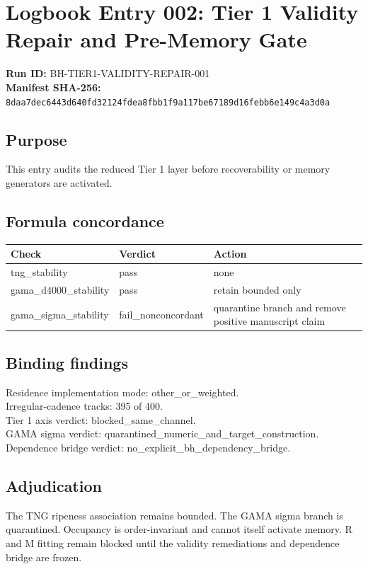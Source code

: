 \documentclass[11pt]{article}
\begin{document}
\section*{Logbook Entry 002: Tier 1 Validity Repair and Pre-Memory Gate}
\textbf{Run ID:} BH-TIER1-VALIDITY-REPAIR-001\\
\textbf{Manifest SHA-256:} \texttt{8daa7dec6443d640fd32124fdea8fbb1f9a117be67189d16febb6e149c4a3d0a}
\subsection*{Purpose}
This entry audits the reduced Tier 1 layer before recoverability or memory generators are activated.
\subsection*{Formula concordance}
\begin{tabular}{lll}\toprule Check & Verdict & Action \\\midrule
tng\_stability & pass & none \\
gama\_d4000\_stability & pass & retain bounded only \\
gama\_sigma\_stability & fail\_nonconcordant & quarantine branch and remove positive manuscript claim \\
\bottomrule\end{tabular}
\subsection*{Binding findings}
Residence implementation mode: other\_or\_weighted.\\
Irregular-cadence tracks: 395 of 400.\\
Tier 1 axis verdict: blocked\_same\_channel.\\
GAMA sigma verdict: quarantined\_numeric\_and\_target\_construction.\\
Dependence bridge verdict: no\_explicit\_bh\_dependency\_bridge.
\subsection*{Adjudication}
The TNG ripeness association remains bounded. The GAMA sigma branch is quarantined. Occupancy is order-invariant and cannot itself activate memory. R and M fitting remain blocked until the validity remediations and dependence bridge are frozen.
\end{document}
